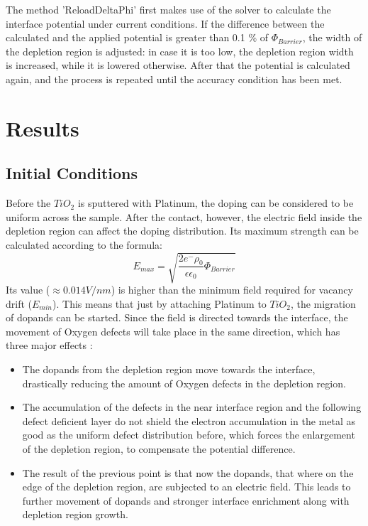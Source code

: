 \documentclass[12pt]{article}
\begin{document}
The method 'ReloadDeltaPhi' first makes use of the solver to calculate the interface potential under current conditions. If the difference between the calculated and the applied potential is greater than 0.1 \% of $\Phi_{Barrier}$, the width of the depletion region is adjusted:
in case it is too low, the depletion region width is increased, while it is lowered otherwise. After that the potential is calculated again, and the process is repeated until the accuracy condition has been met.
		
		\section{Results}
		
		\subsection{Initial Conditions}
		Before the $TiO_2$ is sputtered with Platinum, the doping can be considered to be uniform across the sample. After the contact, however, the electric field inside the depletion region can affect the doping distribution. Its maximum strength can be calculated according to the formula:
		\begin{equation}
			E_{max} = \sqrt{\frac{2 e^- \rho_0}{\epsilon \epsilon_0} \Phi_{Barrier}}
		\end{equation}
		Its value ($\approx 0.014 V/nm $) is higher than the minimum field required for vacancy drift ($E_{min}$). This means that just by attaching Platinum to $TiO_2$, the migration of dopands can be started. Since the field is directed towards the interface, the movement of Oxygen defects will take place in the same direction, which has three major effects :
		\begin{itemize}
			\item The dopands from the depletion region move towards the interface, drastically reducing the amount of Oxygen defects in the depletion region.
			\item The accumulation of the defects in the near interface region and the following defect deficient layer do not shield the electron accumulation in the metal as good as the uniform defect distribution before, which forces the enlargement of the depletion region, to compensate the potential difference.
			\item The result of the previous point is that now the dopands, that where on the edge of the depletion region, are subjected to an electric field. This leads to further movement of dopands and stronger interface enrichment along with depletion region growth.
		\end{itemize}
\end{document}
